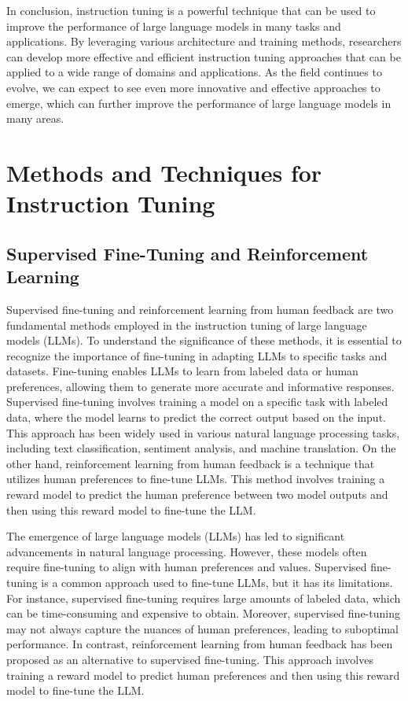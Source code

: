 \documentclass[11pt]{article}
\begin{document}
In conclusion, instruction tuning is a powerful technique that can be used to improve the performance of large language models in many tasks and applications. By leveraging various architecture and training methods, researchers can develop more effective and efficient instruction tuning approaches that can be applied to a wide range of domains and applications. As the field continues to evolve, we can expect to see even more innovative and effective approaches to emerge, which can further improve the performance of large language models in many areas.

\section{Methods and Techniques for Instruction Tuning}

\subsection{Supervised Fine-Tuning and Reinforcement Learning}

Supervised fine-tuning and reinforcement learning from human feedback are two fundamental methods employed in the instruction tuning of large language models (LLMs). To understand the significance of these methods, it is essential to recognize the importance of fine-tuning in adapting LLMs to specific tasks and datasets. Fine-tuning enables LLMs to learn from labeled data or human preferences, allowing them to generate more accurate and informative responses. Supervised fine-tuning involves training a model on a specific task with labeled data, where the model learns to predict the correct output based on the input. This approach has been widely used in various natural language processing tasks, including text classification, sentiment analysis, and machine translation. On the other hand, reinforcement learning from human feedback is a technique that utilizes human preferences to fine-tune LLMs. This method involves training a reward model to predict the human preference between two model outputs and then using this reward model to fine-tune the LLM.

The emergence of large language models (LLMs) \cite{ref41} has led to significant advancements in natural language processing. However, these models often require fine-tuning to align with human preferences and values. Supervised fine-tuning is a common approach used to fine-tune LLMs, but it has its limitations. For instance, supervised fine-tuning requires large amounts of labeled data, which can be time-consuming and expensive to obtain. Moreover, supervised fine-tuning may not always capture the nuances of human preferences, leading to suboptimal performance. In contrast, reinforcement learning from human feedback \cite{ref42} has been proposed as an alternative to supervised fine-tuning. This approach involves training a reward model to predict human preferences and then using this reward model to fine-tune the LLM.
\end{document}
